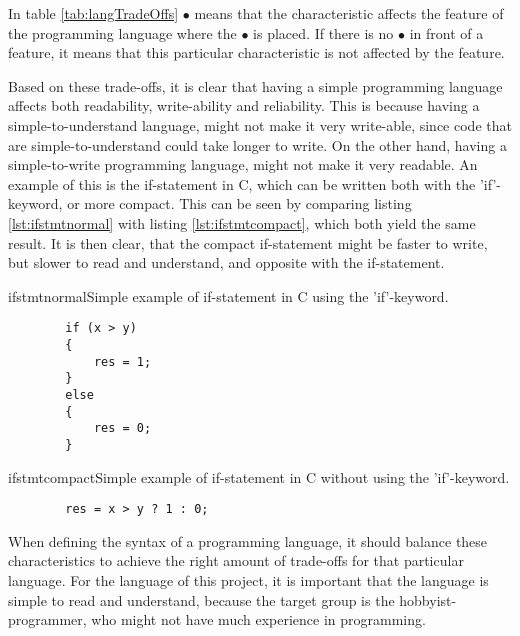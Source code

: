 In table \ref{tab:langTradeOffs} $\bullet$ means that the characteristic affects the feature of the programming language where the $\bullet$ is placed. If there is no $\bullet$ in front of a feature, it means that this particular characteristic is not affected by the feature. 

Based on these trade-offs, it is clear that having a simple programming language affects both readability, write-ability and reliability. 
This is because having a simple-to-understand language, might not make it very write-able, since code that are simple-to-understand could take longer to write. 
On the other hand, having a simple-to-write programming language, might not make it very readable. An example of this is the if-statement in C, which can be written both with the 'if'-keyword, or more compact. This can be seen by comparing listing \ref{lst:ifstmtnormal} with listing \ref{lst:ifstmtcompact}, which both yield the same result. It is then clear, that the compact if-statement might be faster to write, but slower to read and understand, and opposite with the if-statement.

\begin{code}{ifstmtnormal}{Simple example of if-statement in C using the 'if'-keyword.}
	\begin{lstlisting}
		if (x > y)
		{
    		res = 1;
		}
		else
		{
    		res = 0;
		}
	\end{lstlisting}
\end{code}

\begin{code}{ifstmtcompact}{Simple example of if-statement in C without using the 'if'-keyword.}
	\begin{lstlisting}
		res = x > y ? 1 : 0;
	\end{lstlisting}
\end{code}

When defining the syntax of a programming language, it should balance these characteristics to achieve the right amount of trade-offs for that particular language. For the language of this project, it is important that the language is simple to read and understand, because the target group is the hobbyist-programmer, who might not have much experience in programming.

